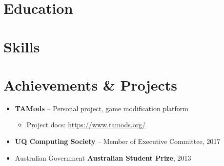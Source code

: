 \documentclass[11pt,a4paper,sans]{moderncv}        %
\begin{document}
\section{Education}


\section{Skills}


\section{Achievements \& Projects}
\begin{minipage}{\maincolumnwidth}\small
	\begin{itemize}
		\item \textbf{TAMods} -- Personal project, game modification platform
		\begin{itemize}
			\item Project docs: \href{https://www.tamods.org/}{https://www.tamods.org/}
		\end{itemize}
		\item \textbf{UQ Computing Society} -- Member of Executive Committee, 2017
		
		\item Australian Government \textbf{Australian Student Prize}, 2013
	\end{itemize}
\end{minipage}

\end{document}

